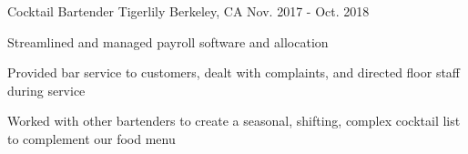 \begin{cventries}
  \cventry
    {Cocktail Bartender} %
    {Tigerlily} %
    {Berkeley, CA} %
    {Nov. 2017 - Oct. 2018} %
    {
      \begin{cvitems} %
        \item {Streamlined and managed payroll software and allocation}
        \item {Provided bar service to customers, dealt with complaints, and directed floor staff during service}
        \item {Worked with other bartenders to create a seasonal, shifting, complex cocktail list to complement our food menu}
      \end{cvitems}
    }


\end{cventries}
